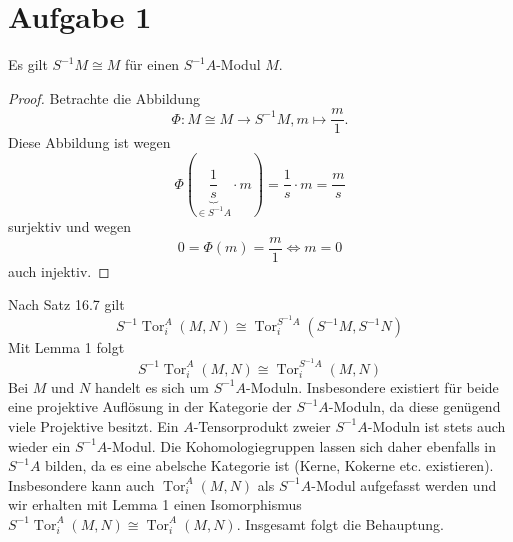 \documentclass{nico_zettelsose21}
\newcommand{\tor}{\operatorname{Tor}}
\begin{document}
\section*{Aufgabe 1}
\begin{lemma*}
    Es gilt $S^{-1}M \cong M$ für einen $S^{-1}A$-Modul $M$.
\end{lemma*}
\begin{proof}
    Betrachte die Abbildung
    \[
        \Phi \colon M \cong M \to S^{-1}M, m \mapsto \frac{m}{1}.
    \]
    Diese Abbildung ist wegen 
    \[
        \Phi(\underbrace{\frac{1}{s}}_{\in S^{-1}A} \cdot m) = \frac{1}{s} \cdot m = \frac{m}{s}
    \] 
    surjektiv und wegen
    \[ 
        0 = \Phi(m) = \frac{m}{1} \Leftrightarrow m = 0
    \] auch injektiv.
\end{proof}
Nach Satz 16.7 gilt
\[
    S^{-1}\tor_i^A(M,N) \cong \tor_i^{S^{-1}A}(S^{-1}M, S^{-1}N)
\]
Mit Lemma 1 folgt
\[
    S^{-1}\tor_i^A(M,N) \cong \tor_i^{S^{-1}A}(M, N)
\]
Bei $M$ und $N$ handelt es sich um $S^{-1}A$-Moduln.
Insbesondere existiert für beide eine projektive Auflösung in der Kategorie der $S^{-1}A$-Moduln, 
da diese genügend viele Projektive besitzt.
Ein $A$-Tensorprodukt zweier $S^{-1}A$-Moduln ist stets auch wieder ein $S^{-1}A$-Modul.
Die Kohomologiegruppen lassen sich daher ebenfalls in $S^{-1}A$ bilden, da es eine abelsche Kategorie ist
(Kerne, Kokerne etc. existieren).
Insbesondere kann auch $\tor_i^A(M,N)$ als $S^{-1}A$-Modul aufgefasst werden und wir erhalten mit Lemma 1
einen Isomorphismus $S^{-1}\tor_i^A(M,N) \cong \tor_i^A(M,N)$.
Insgesamt folgt die Behauptung.
\end{document}

